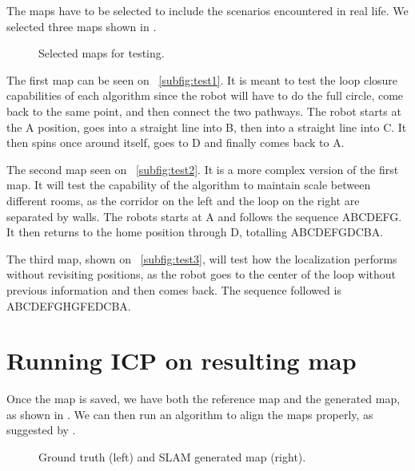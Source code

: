 The maps have to be selected to include the scenarios encountered in real life. We selected three maps shown in .

\begin{figure}[!ht]
     \centering
     \caption{Selected maps for testing.}
     \label{fig:generated_maps}
\end{figure}

The first map can be seen on \figurename~\ref{subfig:test1}. It is meant to test the loop closure capabilities of each algorithm since the robot will have to do the full circle, come back to the same point, and then connect the two pathways. The robot starts at the A position, goes into a straight line into B, then into a straight line into C. It then spins once around itself, goes to D and finally comes back to A.

The second map seen on \figurename~\ref{subfig:test2}. It is a more complex version of the first map. It will test the capability of the algorithm to maintain scale between different rooms, as the corridor on the left and the loop on the right are separated by walls. The robots starts at A and follows the sequence ABCDEFG. It then returns to the home position through D, totalling ABCDEFGDCBA.

The third map, shown on \figurename~\ref{subfig:test3}, will test how the localization performs without revisiting positions, as the robot goes to the center of the loop without previous information and then comes back. The sequence followed is ABCDEFGHGFEDCBA.

\section{Running ICP on resulting map}

Once the map is saved, we have both the reference map and the generated map, as shown in . We can then run an algorithm to align the maps properly, as suggested by \citeauthor{santos2013evaluation}.

\begin{figure}[!ht]
     \centering
     \hspace{2cm}
     \caption{Ground truth (left) and SLAM generated map (right).}
     \label{fig:reference_map_icp}
\end{figure}


